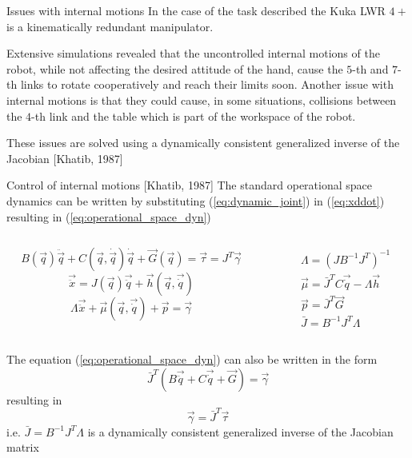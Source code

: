 \begin{frame}{Issues with internal motions}
  In the case of the task described the Kuka LWR $4+$ is a \alert{kinematically redundant manipulator}.
  \par
  Extensive simulations revealed
  that the uncontrolled internal motions of the robot, while not affecting the
  desired attitude of the hand, cause the \alert{$5$-th and $7$-th links to rotate
  cooperatively and reach their limits} soon. Another issue with internal motions
  is that they could cause, in some situations, \alert{collisions} between the $4$-th
  link and the table which is part of the workspace of the robot.
  \par
  These issues are solved using a \alert{dynamically consistent} generalized inverse of the Jacobian [Khatib, 1987]
\end{frame}
  
\begin{frame}{Control of internal motions [Khatib, 1987]}
  The standard operational space dynamics can be written by substituting
  (\ref{eq:dynamic_joint}) in (\ref{eq:xddot}) resulting in (\ref{eq:operational_space_dyn})
  \begin{columns}
    \begin{column}{0.7\columnwidth}
      \begin{equation}\label{eq:dynamic_joint}
      B(\vec{q}) \ddot{\vec{q}} + C(\vec{q}, \dot{\vec{q}}) \dot{\vec{q}} + \vec{G}(\vec{q}) = \vec{\tau} = J^{T} \vec{\gamma}
      \end{equation}
      \begin{equation}\label{eq:xddot}
        \vec{\ddot{x}} = J(\vec{q}) \vec{\ddot{q}} + \vec{h}(\vec{q},\vec{\dot{q}})
      \end{equation}
      \begin{equation}\label{eq:operational_space_dyn}
        \Lambda \vec{\ddot{x}} + \vec{\mu}(\vec{q}, \vec{\dot{q}}) + \vec{p} = \vec{\gamma}
      \end{equation}
    \end{column}
    \begin{column}{0.4\columnwidth}
      \[
      \begin{split}
        &\Lambda = (J B^{-1} J^{T})^{-1}\\
        &\vec{\mu} = \bar{J}^{T} C \vec{\dot{q}} - \Lambda \vec{h}\\
        &\vec{p} = \bar{J}^T \vec{G}\\
        &\bar{J} = B^{-1} J^{T} \Lambda
      \end{split}
      \]
    \end{column}
  \end{columns}
The equation (\ref{eq:operational_space_dyn}) can also be written in the form
\[
\bar{J}^{T} (B \vec{\ddot{q}} + C \vec{\dot{q}} + \vec{G}) = \vec{\gamma}
\]
resulting in 
\[
\vec{\gamma} = \bar{J}^{T} \vec{\tau}
\]
i.e. $\bar{J} = B^{-1} J^{T} \Lambda$ is a dynamically consistent generalized inverse of the Jacobian matrix
\end{frame}

